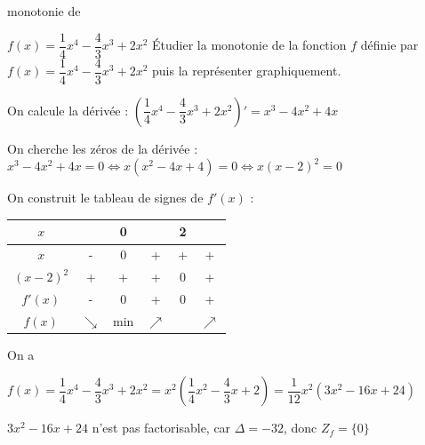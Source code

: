 \documentclass[a4paper,12pt]{article}
\begin{document}
\begin{exemple}[label=ex:premder]
	monotonie de\medskip

	$f(x)=\dfrac{1}{4}x^4-\dfrac{4}{3}x^3+2x^2$
	\tcblower
	Étudier la monotonie de la fonction $f$ définie par $f(x) = \dfrac{1}{4}x^4 - \dfrac{4}{3}x^3 + 2x^2$ puis la représenter graphiquement.

On calcule la dérivée : $\left(\dfrac{1}{4}x^4 - \dfrac{4}{3}x^3 + 2x^2\right)' = x^3 - 4x^2 + 4x$

On cherche les zéros de la dérivée : $x^3 - 4x^2 + 4x = 0 \Leftrightarrow x(x^2 - 4x + 4) = 0 \Leftrightarrow x(x - 2)^2 = 0$

On construit le tableau de signes de $f'(x)$ :
\begin{center}
\begin{tabular}{|c|c|c|c|c|c|}
\hline
$x$ & & 0 & & 2 & \\
\hline
$x$ & - & 0 & + & + & + \\
\hline
$(x-2)^2$ & + & + & + & 0 & + \\
\hline
$f'(x)$ & - & 0 & + & 0 & + \\
\hline
$f(x)$ & $\searrow$ & min & $\nearrow$ & & $\nearrow$ \\
\hline
\end{tabular}
\end{center}
On a 

$f(x) = \dfrac{1}{4}x^4 - \dfrac{4}{3}x^3 + 2x^2 = x^2\left(\dfrac{1}{4}x^2 - \dfrac{4}{3}x + 2\right) = \dfrac{1}{12}x^2(3x^2 - 16x + 24)$

$3x^2 - 16x + 24$ n'est pas factorisable, car $\Delta = -32$, donc $Z_f = \{0\}$


\end{exemple}
\end{document}
